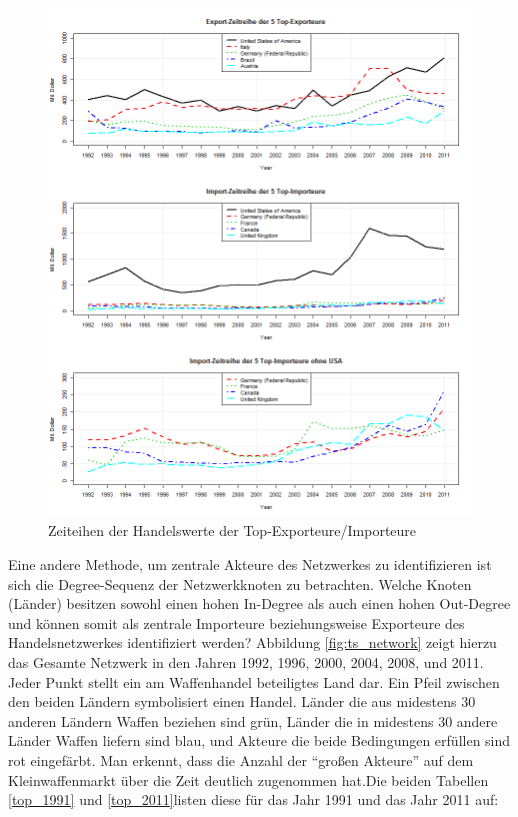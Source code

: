 \documentclass[a4paper,ngerman,oneside,titlepage,bibliography=totoc,11pt]{scrreprt}
\begin{document}
\begin{figure}[h]
	\centering
		\includegraphics[width=1.00\textwidth]{Grafiken/ts_tops.png}
	\caption{Zeiteihen der Handelswerte der Top-Exporteure/Importeure}
	\label{fig:ts_tops}
\end{figure}
Eine andere Methode, um zentrale Akteure des Netzwerkes zu identifizieren ist sich die Degree-Sequenz der Netzwerkknoten zu betrachten. Welche Knoten (Länder) besitzen sowohl einen hohen In-Degree als auch einen hohen Out-Degree und können somit als zentrale Importeure beziehungsweise Exporteure des Handelsnetzwerkes identifiziert werden?
Abbildung \ref{fig:ts_network} zeigt hierzu das Gesamte Netzwerk in den Jahren 1992, 1996, 2000, 2004, 2008, und 2011. Jeder Punkt stellt ein am Waffenhandel beteiligtes Land dar. Ein Pfeil zwischen den beiden Ländern symbolisiert einen Handel. Länder die aus midestens 30 anderen Ländern Waffen beziehen sind grün, Länder die in midestens 30 andere Länder Waffen liefern sind blau, und Akteure die beide Bedingungen erfüllen sind rot eingefärbt. Man erkennt, dass die Anzahl der "`großen Akteure"' auf dem Kleinwaffenmarkt über die Zeit deutlich zugenommen hat.Die beiden Tabellen \ref{top_1991} und \ref{top_2011}listen diese für das Jahr 1991 und das Jahr 2011 auf:
\end{document}
